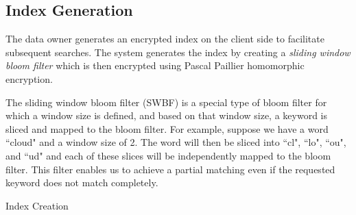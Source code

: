 \subsection{Index Generation}

The data owner generates an encrypted index on the client side to facilitate
subsequent searches. The system generates the index by creating a 
\textit{sliding window bloom filter} which is then encrypted using Pascal Paillier
homomorphic encryption. 

The sliding window bloom filter (SWBF) is a special type of bloom filter
for which a window size is defined, and based on that
window size, a keyword is sliced and mapped to the bloom filter. For example,
suppose we have a word ``cloud" and a window size of 2. The word will then be
sliced into ``cl", ``lo", ``ou", and ``ud" and each of these slices will be 
independently mapped to the bloom filter. This filter enables us to achieve
 a partial matching even if the requested keyword does not match
 completely.

\setlength{\textfloatsep}{5pt}%
\begin{algorithm}[ht!]
\;
 \caption{Index Creation}
 \label{algo:IndexCreation}
\end{algorithm}

